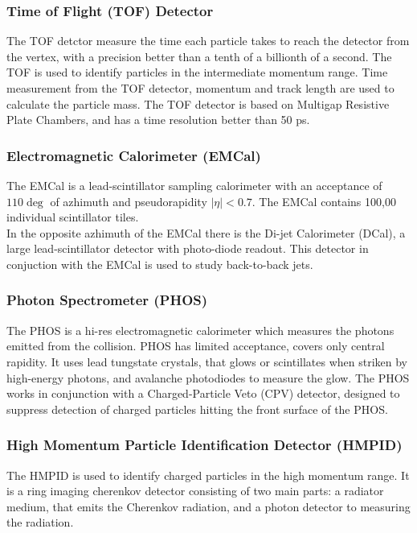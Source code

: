 \documentclass[12pt,a4paper,twoside]{report}
\begin{document}
\subsubsection{Time of Flight (TOF) Detector}
The TOF detctor measure the time each particle takes to reach the detector from the vertex, with a precision better than a tenth of a billionth of a second. The TOF is used to identify particles in the intermediate momentum range. Time measurement from the TOF detector, momentum and track length are used to calculate the particle mass. The TOF detector is based on Multigap Resistive Plate Chambers, and has a time resolution better than 50 ps. \cite{Ref:ALICE-detectors-TOF}
\subsubsection{Electromagnetic Calorimeter (EMCal)}
The EMCal is a lead-scintillator sampling calorimeter with an acceptance of $110\deg$ of azhimuth and pseudorapidity $|\eta|<0.7$. The EMCal contains 100,00 individual scintillator tiles.\\
In the opposite azhimuth of the EMCal there is the Di-jet Calorimeter (DCal), a large lead-scintillator detector with photo-diode readout. This detector in conjuction with the EMCal is used to study back-to-back jets. \cite{Ref:ALICE-detectors-EMCal}
\subsubsection{Photon Spectrometer (PHOS)}
The PHOS is a hi-res electromagnetic calorimeter which measures the photons emitted from the collision. PHOS has limited acceptance, covers only central rapidity. It uses lead tungstate crystals, that glows or scintillates when striken by high-energy photons, and avalanche photodiodes to measure the glow. The PHOS works in conjunction with a Charged-Particle Veto (CPV) detector, designed to suppress detection of charged particles hitting the front surface of the PHOS. \cite{Ref:ALICE-detectors-PHOS}
\subsubsection{High Momentum Particle Identification Detector (HMPID)}
The HMPID is used to identify charged particles in the high momentum range. It is a ring imaging cherenkov detector consisting of two main parts: a radiator medium, that emits the Cherenkov radiation, and a photon detector to measuring the radiation. \cite{Ref:ALICE-detectors-HMPID}
\end{document}
